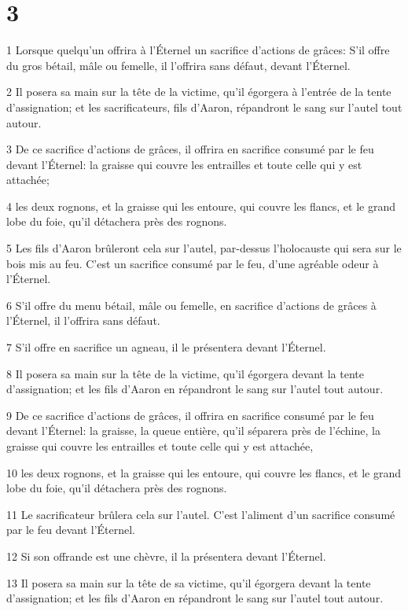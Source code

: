 \chapter{3}

\par 1 Lorsque quelqu'un offrira à l'Éternel un sacrifice d'actions de grâces: S'il offre du gros bétail, mâle ou femelle, il l'offrira sans défaut, devant l'Éternel.
\par 2 Il posera sa main sur la tête de la victime, qu'il égorgera à l'entrée de la tente d'assignation; et les sacrificateurs, fils d'Aaron, répandront le sang sur l'autel tout autour.
\par 3 De ce sacrifice d'actions de grâces, il offrira en sacrifice consumé par le feu devant l'Éternel: la graisse qui couvre les entrailles et toute celle qui y est attachée;
\par 4 les deux rognons, et la graisse qui les entoure, qui couvre les flancs, et le grand lobe du foie, qu'il détachera près des rognons.
\par 5 Les fils d'Aaron brûleront cela sur l'autel, par-dessus l'holocauste qui sera sur le bois mis au feu. C'est un sacrifice consumé par le feu, d'une agréable odeur à l'Éternel.
\par 6 S'il offre du menu bétail, mâle ou femelle, en sacrifice d'actions de grâces à l'Éternel, il l'offrira sans défaut.
\par 7 S'il offre en sacrifice un agneau, il le présentera devant l'Éternel.
\par 8 Il posera sa main sur la tête de la victime, qu'il égorgera devant la tente d'assignation; et les fils d'Aaron en répandront le sang sur l'autel tout autour.
\par 9 De ce sacrifice d'actions de grâces, il offrira en sacrifice consumé par le feu devant l'Éternel: la graisse, la queue entière, qu'il séparera près de l'échine, la graisse qui couvre les entrailles et toute celle qui y est attachée,
\par 10 les deux rognons, et la graisse qui les entoure, qui couvre les flancs, et le grand lobe du foie, qu'il détachera près des rognons.
\par 11 Le sacrificateur brûlera cela sur l'autel. C'est l'aliment d'un sacrifice consumé par le feu devant l'Éternel.
\par 12 Si son offrande est une chèvre, il la présentera devant l'Éternel.
\par 13 Il posera sa main sur la tête de sa victime, qu'il égorgera devant la tente d'assignation; et les fils d'Aaron en répandront le sang sur l'autel tout autour.
